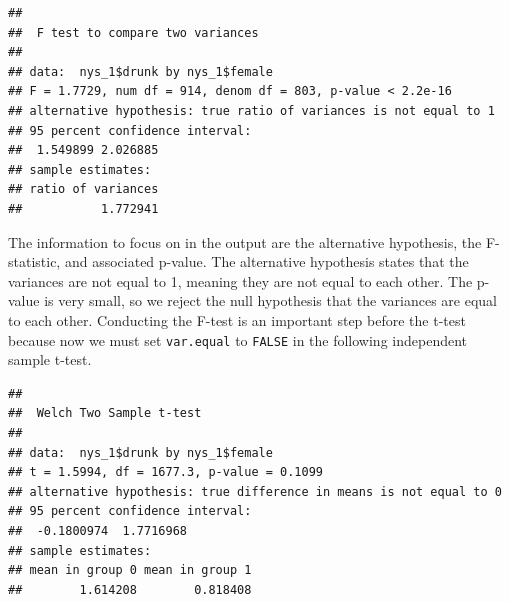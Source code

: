 \documentclass[
]{book}
\newenvironment{Shaded}{\begin{snugshade}}{\end{snugshade}}
\newcommand{\AttributeTok}[1]{\textcolor[rgb]{0.77,0.63,0.00}{#1}}
\newcommand{\CommentTok}[1]{\textcolor[rgb]{0.56,0.35,0.01}{\textit{#1}}}
\newcommand{\ConstantTok}[1]{\textcolor[rgb]{0.00,0.00,0.00}{#1}}
\newcommand{\FunctionTok}[1]{\textcolor[rgb]{0.00,0.00,0.00}{#1}}
\newcommand{\NormalTok}[1]{#1}
\newcommand{\OtherTok}[1]{\textcolor[rgb]{0.56,0.35,0.01}{#1}}
\newcommand{\SpecialCharTok}[1]{\textcolor[rgb]{0.00,0.00,0.00}{#1}}
\begin{document}
\begin{verbatim}
## 
##  F test to compare two variances
## 
## data:  nys_1$drunk by nys_1$female
## F = 1.7729, num df = 914, denom df = 803, p-value < 2.2e-16
## alternative hypothesis: true ratio of variances is not equal to 1
## 95 percent confidence interval:
##  1.549899 2.026885
## sample estimates:
## ratio of variances 
##           1.772941
\end{verbatim}

The information to focus on in the output are the alternative hypothesis, the F-statistic, and associated p-value. The alternative hypothesis states that the variances are not equal to 1, meaning they are not equal to each other. The p-value is very small, so we reject the null hypothesis that the variances are equal to each other. Conducting the F-test is an important step before the t-test because now we must set \texttt{var.equal} to \texttt{FALSE} in the following independent sample t-test.

\begin{Shaded}
\end{Shaded}

\begin{verbatim}
## 
##  Welch Two Sample t-test
## 
## data:  nys_1$drunk by nys_1$female
## t = 1.5994, df = 1677.3, p-value = 0.1099
## alternative hypothesis: true difference in means is not equal to 0
## 95 percent confidence interval:
##  -0.1800974  1.7716968
## sample estimates:
## mean in group 0 mean in group 1 
##        1.614208        0.818408
\end{verbatim}

\begin{Shaded}
\end{Shaded}
\end{document}
